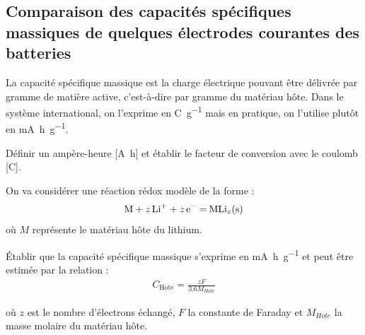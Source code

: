 \subsection{Comparaison des capacités spécifiques massiques de quelques électrodes courantes des batteries }

\setcounter{equation}{0}
\setcounter{Q}{0}

La capacité spécifique massique est la charge électrique pouvant être délivrée par gramme de matière active, c'est-à-dire par gramme du matériau hôte. Dans le système international, on l'exprime en \si{\coulomb\per\gram} mais en pratique, on l'utilise plutôt en \si{\milli\ampere\hour\per\gram}.

\Q \label{Q:11-01} Définir un ampère-heure [\si{\ampere\hour}] et établir le facteur de conversion avec le coulomb [\si{\coulomb}].

\Q \label{Q:11-02} On va considérer une réaction rédox modèle de la forme : 
\begin{align*}
\ce{M + z Li^+ + z e^- = MLi_z(s)}
\end{align*}
où $M$ représente le matériau hôte du lithium.

\'{E}tablir que la capacité spécifique massique s'exprime en \si{\milli\ampere\hour\per\gram} et peut être estimée par la relation :  
\begin{align*}
C_\text{Hote} = \frac{z F}{3.6 M_{Hote}}
\end{align*}

où $z$ est le nombre d'électrons échangé, $F$ la constante de Faraday et $M_{Hote}$ la masse molaire du matériau hôte.


